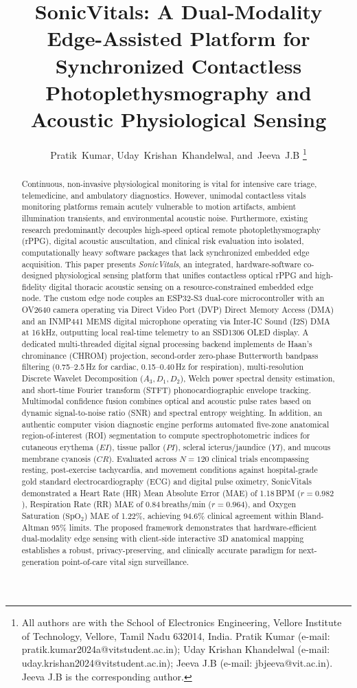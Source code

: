 \documentclass[journal]{IEEEtran}
\title{SonicVitals: A Dual-Modality Edge-Assisted Platform for Synchronized Contactless Photoplethysmography and Acoustic Physiological Sensing}
\author{
Pratik~Kumar,
Uday~Krishan~Khandelwal,
and~Jeeva~J.B
\thanks{
All authors are with the School of Electronics Engineering, Vellore Institute of Technology, Vellore, Tamil Nadu 632014, India.
Pratik Kumar (e-mail: pratik.kumar2024a@vitstudent.ac.in);
Uday Krishan Khandelwal (e-mail: uday.krishan2024@vitstudent.ac.in);
Jeeva J.B (e-mail: jbjeeva@vit.ac.in).
Jeeva J.B is the corresponding author.
}
}
\begin{document}
\maketitle

\begin{abstract}
Continuous, non-invasive physiological monitoring is vital for intensive care triage, telemedicine, and ambulatory diagnostics. However, unimodal contactless vitals monitoring platforms remain acutely vulnerable to motion artifacts, ambient illumination transients, and environmental acoustic noise. Furthermore, existing research predominantly decouples high-speed optical remote photoplethysmography (rPPG), digital acoustic auscultation, and clinical risk evaluation into isolated, computationally heavy software packages that lack synchronized embedded edge acquisition. This paper presents \textit{SonicVitals}, an integrated, hardware-software co-designed physiological sensing platform that unifies contactless optical rPPG and high-fidelity digital thoracic acoustic sensing on a resource-constrained embedded edge node. The custom edge node couples an ESP32-S3 dual-core microcontroller with an OV2640 camera operating via Direct Video Port (DVP) Direct Memory Access (DMA) and an INMP441 MEMS digital microphone operating via Inter-IC Sound (I2S) DMA at 16\,kHz, outputting local real-time telemetry to an SSD1306 OLED display. A dedicated multi-threaded digital signal processing backend implements de Haan's chrominance (CHROM) projection, second-order zero-phase Butterworth bandpass filtering (0.75--2.5\,Hz for cardiac, 0.15--0.40\,Hz for respiration), multi-resolution Discrete Wavelet Decomposition ($A_3, D_1, D_2$), Welch power spectral density estimation, and short-time Fourier transform (STFT) phonocardiographic envelope tracking. Multimodal confidence fusion combines optical and acoustic pulse rates based on dynamic signal-to-noise ratio (SNR) and spectral entropy weighting. In addition, an authentic computer vision diagnostic engine performs automated five-zone anatomical region-of-interest (ROI) segmentation to compute spectrophotometric indices for cutaneous erythema ($EI$), tissue pallor ($PI$), scleral icterus/jaundice ($YI$), and mucous membrane cyanosis ($CR$). Evaluated across $N=120$ clinical trials encompassing resting, post-exercise tachycardia, and movement conditions against hospital-grade gold standard electrocardiography (ECG) and digital pulse oximetry, SonicVitals demonstrated a Heart Rate (HR) Mean Absolute Error (MAE) of 1.18\,BPM ($r = 0.982$), Respiration Rate (RR) MAE of 0.84\,breaths/min ($r = 0.964$), and Oxygen Saturation ($\mathrm{SpO_2}$) MAE of 1.22\%, achieving 94.6\% clinical agreement within Bland-Altman 95\% limits. The proposed framework demonstrates that hardware-efficient dual-modality edge sensing with client-side interactive 3D anatomical mapping establishes a robust, privacy-preserving, and clinically accurate paradigm for next-generation point-of-care vital sign surveillance.
\end{abstract}
\end{document}
